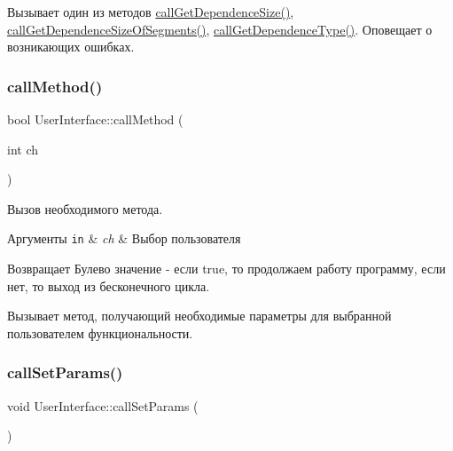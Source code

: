 Вызывает один из методов \hyperlink{class_user_interface_a1dc307f92c919866f13ddaf30cde1a70}{call\+Get\+Dependence\+Size()}, \hyperlink{class_user_interface_ab668f3b2d9f89ce3eacda5e166f33807}{call\+Get\+Dependence\+Size\+Of\+Segments()}, \hyperlink{class_user_interface_aa413c00a65ae4faf9421e9fc359663ec}{call\+Get\+Dependence\+Type()}. Оповещает о возникающих ошибках. \hypertarget{class_user_interface_ad388ff348c0a124038f4ea9756b80041}{}\label{class_user_interface_ad388ff348c0a124038f4ea9756b80041} 
\subsubsection{\texorpdfstring{call\+Method()}{callMethod()}}
{\footnotesize\ttfamily bool User\+Interface\+::call\+Method (\begin{DoxyParamCaption}\item[{int}]{ch }\end{DoxyParamCaption})\hspace{0.3cm}{\ttfamily [private]}}



Вызов необходимого метода. 


\begin{DoxyParams}[1]{Аргументы}
\mbox{\tt in}  & {\em ch} & Выбор пользователя \\
\hline
\end{DoxyParams}
\begin{DoxyReturn}{Возвращает}
Булево значение -\/ если true, то продолжаем работу программу, если нет, то выход из бесконечного цикла.
\end{DoxyReturn}
Вызывает метод, получающий необходимые параметры для выбранной пользователем функциональности. \hypertarget{class_user_interface_adcabf6c8f2be4b4ec712c4674156bf59}{}\label{class_user_interface_adcabf6c8f2be4b4ec712c4674156bf59} 
\subsubsection{\texorpdfstring{call\+Set\+Params()}{callSetParams()}}
{\footnotesize\ttfamily void User\+Interface\+::call\+Set\+Params (\begin{DoxyParamCaption}{ }\end{DoxyParamCaption})\hspace{0.3cm}{\ttfamily [private]}}



